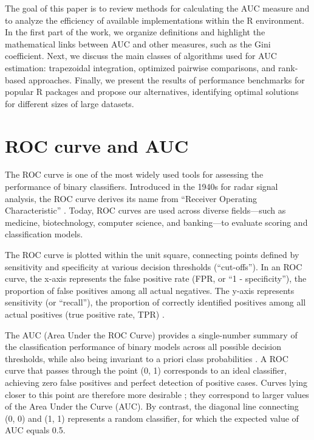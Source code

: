 The goal of this paper is to review methods for calculating the AUC
measure and to analyze the efficiency of available implementations
within the R environment. In the first part of the work, we organize
definitions and highlight the mathematical links between AUC and other
measures, such as the Gini coefficient. Next, we discuss the main
classes of algorithms used for AUC estimation: trapezoidal integration,
optimized pairwise comparisons, and rank-based approaches. Finally, we
present the results of performance benchmarks for popular R packages and
propose our alternatives, identifying optimal solutions for different
sizes of large datasets.

\section{ROC curve and AUC}\label{roc-curve-and-auc}

The ROC curve is one of the most widely used tools for assessing the
performance of binary classifiers. Introduced in the 1940s for radar
signal analysis, the ROC curve derives its name from ``Receiver Operating
Characteristic'' \citep{Junge_Dettori_2018}. Today, ROC curves are used across
diverse fields---such as medicine, biotechnology, computer science, and
banking---to evaluate scoring and classification models.

The ROC curve is plotted within the unit square, connecting points
defined by sensitivity and specificity at various decision thresholds
(``cut-offs''). In an ROC curve, the x-axis represents the false positive
rate (FPR, or ``1 - specificity''), the proportion of false positives
among all actual negatives. The y-axis represents sensitivity (or
``recall''), the proportion of correctly identified positives among all
actual positives (true positive rate, TPR) \citep{Fawcett_2006}.

The AUC (Area Under the ROC Curve) provides a single-number summary of
the classification performance of binary models across all possible
decision thresholds, while also being invariant to a priori class
probabilities \citep{Bradley_1997}. A ROC curve that passes through the point
(0, 1) corresponds to an ideal classifier, achieving zero false
positives and perfect detection of positive cases. Curves lying closer
to this point are therefore more desirable \citep{Hanley_McNeil_1982}; they
correspond to larger values of the Area Under the Curve (AUC). By
contrast, the diagonal line connecting (0, 0) and (1, 1) represents a
random classifier, for which the expected value of AUC equals 0.5.

